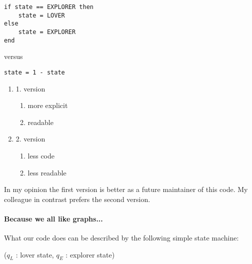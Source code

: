 \documentclass[12pt]{article}
\begin{document}
\begin{lstlisting}
if state == EXPLORER then
	state = LOVER
else
	state = EXPLORER
end
\end{lstlisting}
versus
\begin{lstlisting}
state = 1 - state
\end{lstlisting}
\begin{enumerate}
\item 1. version 
	\begin{enumerate}
		\item more explicit
		\item readable
	\end{enumerate}
\item 2. version
	\begin{enumerate}
		\item less code
		\item less readable
	\end{enumerate}
\end{enumerate}

In my opinion the first version is better as a future maintainer of this code.
My colleague in contrast prefers the second version.
\paragraph{Because we all like graphs...}
What our code does can be described by the following simple state machine:
\begin{figure}[!htb]
\centering

\end{figure}

($q_L$ : lover state, $q_E$ : explorer state)
\end{document}

